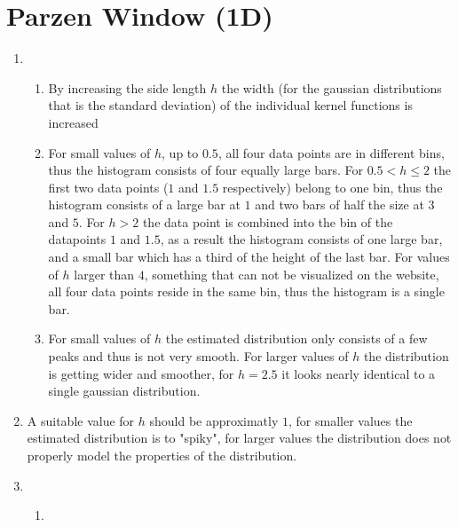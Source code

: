\documentclass[DIN, pagenumber=false, fontsize=11pt, parskip=half]{scrartcl}
\begin{document}
    \section{Parzen Window (1D)}
    \begin{enumerate}
        \item 
            \begin{enumerate}[label=\alph*)]
                \item By increasing the side length $h$ the width (for the gaussian distributions that is the standard deviation) of the individual kernel functions is increased
                \item For small values of $h$, up to $0.5$, all four data points are in different bins, thus the histogram consists of four equally large bars.
                    For $0.5 < h \leq 2$ the first two data points ($1$ and $1.5$ respectively) belong to one bin, thus the histogram consists of a large bar at $1$ and two bars of half the size at $3$ and $5$. 
                    For $h > 2$ the data point is combined into the bin of the datapoints $1$ and $1.5$, as a result the histogram consists of one large bar, and a small bar which has a third of the height of the last bar. 
                    For values of $h$ larger than $4$, something that can not be visualized on the website, all four data points reside in the same bin, thus the histogram is a single bar.
                \item For small values of $h$ the estimated distribution only consists of a few peaks and thus is not very smooth.
                    For larger values of $h$ the distribution is getting wider and smoother, for $h=2.5$ it looks nearly identical to a single gaussian distribution.
            \end{enumerate}
        \item A suitable value for $h$ should be approximatly $1$, for smaller values the estimated distribution is to "spiky", for larger values the distribution  does not properly model the properties of the distribution.
        \item
            \begin{enumerate}[label=\alph*)]
                \item $ $
                    \begin{figure}[H]
                        \centering
\end{figure}
\end{enumerate}
\end{enumerate}
\end{document}
